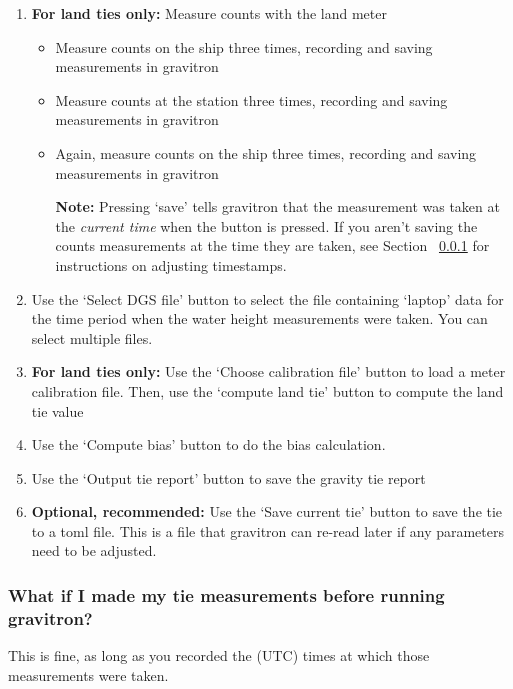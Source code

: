 \documentclass{pfpe-manual}
\begin{document}
\begin{enumerate}
\begin{itemize}
    \item[\textbf{Note:}] Pressing `save' tells gravitron that the measurement was taken at the \textit{current time} when the button is pressed. If you aren't saving the water height measurements at the time they are taken, see Section ~\ref{later} for instructions on adjusting timestamps.
    \end{itemize}
\item \textbf{For land ties only:} Measure counts with the land meter
    \begin{itemize}
    \item Measure counts on the ship three times, recording and saving measurements in gravitron
    \item Measure counts at the station three times, recording and saving measurements in gravitron
    \item Again, measure counts on the ship three times, recording and saving measurements in gravitron
    \item[\textbf{Note:}] Pressing `save' tells gravitron that the measurement was taken at the \textit{current time} when the button is pressed. If you aren't saving the counts measurements at the time they are taken, see Section ~\ref{later} for instructions on adjusting timestamps.
    \end{itemize}
\item Use the `Select DGS file' button to select the file containing `laptop' data for the time period when the water height measurements were taken. You can select multiple files.
\item \textbf{For land ties only:} Use the `Choose calibration file' button to load a meter calibration file. Then, use the `compute land tie' button to compute the land tie value
\item Use the `Compute bias' button to do the bias calculation.
\item Use the `Output tie report' button to save the gravity tie report
\item \textbf{Optional, recommended:} Use the `Save current tie' button to save the tie to a toml file. This is a file that gravitron can re-read later if any parameters need to be adjusted.
\end{enumerate}

\subsubsection{What if I made my tie measurements before running gravitron?}
\label{later}
This is fine, as long as you recorded the (UTC) times at which those measurements were taken.
\end{document}
